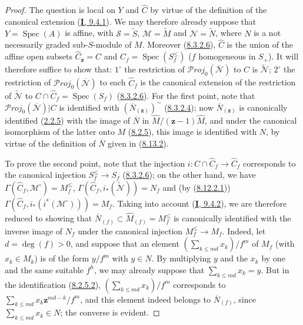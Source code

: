 \begin{proof}
The question is local on $Y$ and $\widehat{C}$ by virtue of the definition of
the canonical extension (\hyperref[I.9.4.1]{\textbf{I}, 9.4.1}). We may therefore
already suppose that $Y=\operatorname{Spec}(A)$ is affine, with
$\mathcal{S}=\widetilde{S}$, $\mathcal{M}=\widetilde{M}$ and
$\mathcal{N}=\widetilde{N}$, where $N$ is a not necessarily graded
sub-$S$-module of $M$. Moreover
(\hyperref[II.8.3.2.6]{8.3.2.6}), $\widehat{C}$ is the union of the affine
open subsets $\widehat{C}_{\mathbf{z}}=C$ and
$\widehat{C}_f=\operatorname{Spec}(S_f^{\leq})$ ($f$ homogeneous in $S_+$).
It will therefore suffice to show that: $1^\circ$ the restriction of
$\mathcal{P}\mathit{roj}_0(\overline{\mathcal{N}})$ to $C$ is
$\widetilde{\mathcal{N}}$; $2^\circ$ the restriction of
$\mathcal{P}\mathit{roj}_0(\overline{\mathcal{N}})$ to each $\widehat{C}_f$ is
the canonical extension of the restriction of $\widetilde{\mathcal{N}}$ to
$C\cap\widehat{C}_f=\operatorname{Spec}(S_f)$
(\hyperref[II.8.3.2.6]{8.3.2.6}). For the first point, note that
$\mathcal{P}\mathit{roj}_0(\overline{\mathcal{N}})|C$ is identified with
$(\overline{N}_{(\mathbf{z})})^{\sim}$
(\hyperref[II.8.3.2.4]{8.3.2.4}); now $\overline{N}_{(\mathbf{z})}$ is canonically
identified (\hyperref[II.2.2.5]{2.2.5}) with the image of
$\overline{N}$ in $\widehat{M}/(\mathbf{z}-1)\widehat{M}$, and under the canonical
isomorphism of the latter onto $M$ (\hyperref[II.8.2.5]{8.2.5}), this
image is identified with $N$, by virtue of the definition of $\overline{N}$
given in (\hyperref[II.8.13.2]{8.13.2}).

To prove the second point, note that the injection
$i:C\cap\widehat{C}_f\to\widehat{C}_f$ corresponds to the canonical injection
$S_f^{\leq}\to S_f$ (\hyperref[II.8.3.2.6]{8.3.2.6}); on the other hand, we
have $\Gamma(\widehat{C}_f,\mathcal{M}^{\square})=M_f^{\leq}$,
$\Gamma(\widehat{C}_f,i_*(\widetilde{\mathcal{N}}))=N_f$ and (by
(\hyperref[II.8.12.2.1]{8.12.2.1}))
$\Gamma(\widehat{C}_f,i_*(i^*(\mathcal{M}^{\square})))=M_f$. Taking into
account (\hyperref[I.9.4.2]{\textbf{I}, 9.4.2}), we are therefore reduced to showing
that $\overline{N}_{(f)}\subset\widehat{M}_{(f)}=M_f^{\leq}$ is canonically
identified with the inverse image of $N_f$ under the canonical injection
$M_f^{\leq}\to M_f$. Indeed, let $d=\deg(f)>0$, and suppose that an
element $(\sum_{k\leqslant md}x_k)/f^m$ of $M_f$ (with $x_k\in M_k$) is of
the form $y/f^m$ with $y\in N$. By multiplying $y$ and the $x_k$ by one and
the same suitable $f^h$, we may already suppose that
$\sum_{k\leqslant md}x_k=y$. But in the identification
(\hyperref[II.8.2.5.2]{8.2.5.2}), $(\sum_{k\leqslant md}x_k)/f^m$
corresponds to $\sum_{k\leqslant md}x_k\mathbf{z}^{md-k}/f^m$, and this element indeed
belongs to $\overline{N}_{(f)}$, since $\sum_{k\leqslant md}x_k\in N$; the
converse is evident.
\end{proof}

